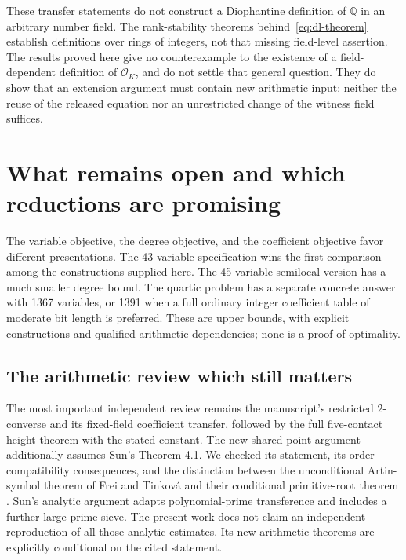 \documentclass[11pt]{article}
\theoremstyle{definition}
\begin{document}
These transfer statements do not construct a Diophantine definition of
$\mathbb Q$ in an arbitrary number field.  The rank-stability theorems
behind~\eqref{eq:dl-theorem} establish definitions over rings of integers,
not that missing field-level assertion.  The results proved here give
no counterexample to the existence of a field-dependent definition of
$\mathcal O_K$, and do not settle that general question.  They do show
that an extension argument must contain new arithmetic input: neither
the reuse of the released equation nor an unrestricted change of the
witness field suffices.


\section{What remains open and which reductions are promising}
\label{sec:strategy}

The variable objective, the degree objective, and the coefficient objective
favor different presentations. The 43-variable specification wins the
first comparison among the constructions supplied here. The 45-variable
semilocal version has a much smaller degree bound. The quartic problem
has a separate concrete answer with 1367 variables, or 1391 when a full
ordinary integer coefficient table of moderate bit length is preferred.
These are upper bounds, with explicit constructions and qualified
arithmetic dependencies; none is a proof of optimality.

\subsection{The arithmetic review which still matters}

The most important independent review remains the manuscript's restricted
$2$-converse and its fixed-field coefficient transfer, followed by the
full five-contact height theorem with the stated constant. The new
shared-point argument additionally assumes Sun's Theorem 4.1. We checked
its statement, its order-compatibility consequences, and the distinction
between the unconditional Artin-symbol theorem of Frei and Tinkov\'a
and their conditional primitive-root theorem
\cite{FreiTinkova2025}. Sun's analytic argument adapts polynomial-prime
transference \cite{TaoZiegler2018} and includes a further large-prime
sieve. The present work does not claim an independent reproduction of
all those analytic estimates. Its new arithmetic theorems are explicitly
conditional on the cited statement.
\end{document}
